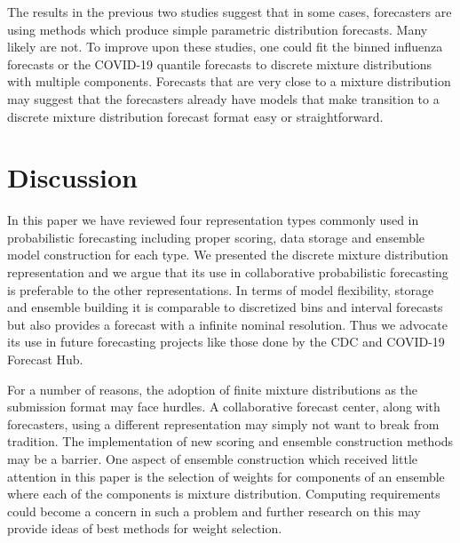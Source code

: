 \documentclass[11pt,notitlepage]{isuthesis}
\begin{document}
The results in the previous two studies suggest that in some cases, forecasters
are using methods which produce simple parametric distribution forecasts. Many
likely are not. To improve upon these studies, one could fit the binned 
influenza forecasts or the COVID-19 quantile forecasts to discrete mixture 
distributions with multiple components. Forecasts that are very close to 
a mixture distribution may suggest that the forecasters already have models that
make transition to a discrete mixture distribution forecast format easy or
straightforward.

















\chapter{Discussion}

In this paper we have reviewed four representation types commonly used in
probabilistic 
forecasting including proper scoring, data storage and ensemble model 
construction for each type. We presented the discrete mixture distribution
representation and we argue that its use in collaborative probabilistic 
forecasting is preferable to the other representations.
In terms of model flexibility, storage and 
ensemble building it is
comparable to discretized bins and interval forecasts but also provides a 
forecast with a infinite nominal resolution. Thus we advocate its use in
future forecasting projects like those done by the CDC and COVID-19 Forecast 
Hub.

For a number of reasons, the adoption of finite mixture distributions as the
submission format may face hurdles. A collaborative forecast center, along with 
forecasters, using a 
different representation may simply not want to break from tradition. The 
implementation of new scoring and ensemble construction methods may be a 
barrier. One aspect of ensemble construction which received little attention in 
this paper is the selection of weights for components of an ensemble where each
of the components is mixture distribution. Computing requirements could become a
concern in such a problem and further research on this may provide
ideas of best methods for weight selection.
\end{document}
